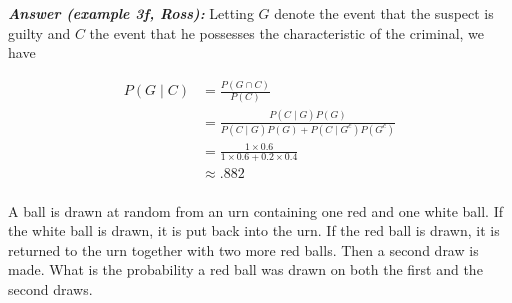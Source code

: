 \documentclass[12pt]{article}
\newenvironment{question}[2][Question]{\begin{trivlist}
\item[\hskip \labelsep {\bfseries #1}\hskip \labelsep {\bfseries #2.}]}{\end{trivlist}}
\begin{document}
 \textbf{\color{TealBlue}\emph{Answer (example 3f, Ross):} }  Letting $G$ denote the event that the suspect is guilty and $C$ the event that he possesses the characteristic of the criminal, we have
  
  \begin{align*}
P(G \mid C) &= \frac{P(G \cap C)} {P(C)}\\
&= \frac{P(C \mid G)P(G)}{P(C \mid G)P(G) + P(C \mid G^c)P(G^c)}\\
&= \frac{1 \times 0.6}{1 \times 0.6 + 0.2 \times 0.4}\\
&\approx .882\\
\end{align*}


\vspace{5mm}
 \begin{question}{4} A ball is drawn at random from an urn containing one red and one white ball. If the white ball is drawn, it is put back into the urn. If the red ball is drawn, it is returned to the urn together with two more red balls. Then a second draw is made. What is the probability a red ball was drawn on both the first and the second draws.
\end{question} 
\end{document}
